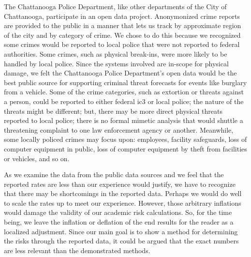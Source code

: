 The Chattanooga Police Department, like other departments of the City of Chattanooga, participate in an open data project.  Anonymonized crime reports are provided to the public in a manner that lets us track by approximate region of the city and by category of crime.  We chose to do this because we recognized some crimes would be reported to local police that were not reported to federal authorities.  Some crimes, such as physical break-ins, were more likely to be handled by local police.  Since the systems involved are in-scope for physical damage, we felt the Chattanooga Police Department's open data would be the best public source for supporting criminal \gls{threat} forecasts for events like burglary from a vehicle.  Some of the crime categories, such as extortion or threats against a person, could be reported to either federal \gls{ic3} or local police; the nature of the threats might be different; but, there may be more direct physical threats reported to local police; there is no formal mimetic analysis that would shuttle a threatening complaint to one law enforcement agency or another.  Meanwhile, some locally policed crimes may focus upon:  employees, facility safeguards, loss of computer equipment in public, loss of computer equipment by theft from facilities or vehicles, and so on.

As we examine the data from the public data sources and we feel that the reported rates are less than our experience would justify, we have to recognize that there may be shortcomings in the reported data.  Perhaps we would do well to scale the rates up to meet our experience.  However, those arbitrary inflations would damage the validity of our academic risk calculations.  So, for the time being, we leave the inflation or deflation of the end results for the reader as a localized adjustment.  Since our main goal is to show a method for determining the risks through the reported data, it could be argued that the exact numbers are less relevant than the demonstrated methods.
